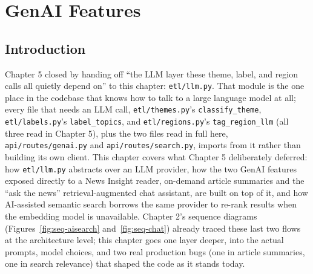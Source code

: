 \chapter{GenAI Features}

\section{Introduction}
\begin{sloppypar}
Chapter 5 closed by handing off ``the LLM layer these theme, label, and region calls all quietly depend on'' to this chapter: \texttt{etl/\allowbreak llm.py}. That module is the one place in the codebase that knows how to talk to a large language model at all; every file that needs an LLM call, \texttt{etl/\allowbreak themes.py}'s \texttt{classify\_theme}, \texttt{etl/\allowbreak labels.py}'s \texttt{label\_topics}, and \texttt{etl/\allowbreak regions.py}'s \texttt{tag\_region\_llm} (all three read in Chapter 5), plus the two files read in full here, \texttt{api/\allowbreak routes/\allowbreak genai.py} and \texttt{api/\allowbreak routes/\allowbreak search.py}, imports from it rather than building its own client. This chapter covers what Chapter 5 deliberately deferred: how \texttt{etl/llm.py} abstracts over an LLM provider, how the two GenAI features exposed directly to a News Insight reader, on-demand article summaries and the ``ask the news'' retrieval-augmented chat assistant, are built on top of it, and how AI-assisted semantic search borrows the same provider to re-rank results when the embedding model is unavailable. Chapter 2's sequence diagrams (Figures~\ref{fig:seq-aisearch} and~\ref{fig:seq-chat}) already traced these last two flows at the architecture level; this chapter goes one layer deeper, into the actual prompts, model choices, and two real production bugs (one in article summaries, one in search relevance) that shaped the code as it stands today.
\end{sloppypar}

